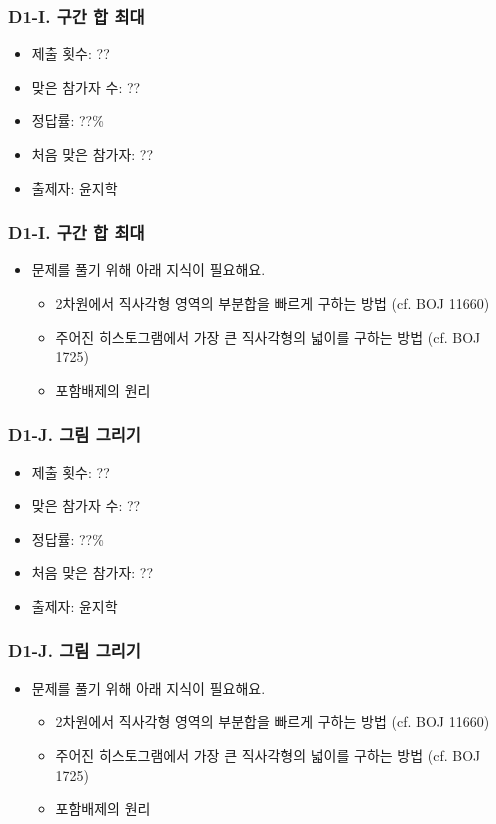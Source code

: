 \documentclass[xetex]{beamer}
\begin{document}
\begin{frame}
  \frametitle{D1-I. 구간 합 최대}
  \begin{itemize}
    \item 제출 횟수: ??
    \item 맞은 참가자 수: ??
    \item 정답률: ??\%
    \item 처음 맞은 참가자: ??
    \item 출제자: 윤지학
  \end{itemize}
\end{frame}

\begin{frame}
  \frametitle{D1-I. 구간 합 최대}
  \begin{itemize}
    \item 문제를 풀기 위해 아래 지식이 필요해요.
    \begin{itemize}
      \item 2차원에서 직사각형 영역의 부분합을 빠르게 구하는 방법 (cf. BOJ 11660)
      \item 주어진 히스토그램에서 가장 큰 직사각형의 넓이를 구하는 방법 (cf. BOJ 1725)
      \item 포함배제의 원리
    \end{itemize}
  \end{itemize}
\end{frame}

\begin{frame}
  \frametitle{D1-J. 그림 그리기}
  \begin{itemize}
    \item 제출 횟수: ??
    \item 맞은 참가자 수: ??
    \item 정답률: ??\%
    \item 처음 맞은 참가자: ??
    \item 출제자: 윤지학
  \end{itemize}
\end{frame}

\begin{frame}
  \frametitle{D1-J. 그림 그리기}
  \begin{itemize}
    \item 문제를 풀기 위해 아래 지식이 필요해요.
    \begin{itemize}
      \item 2차원에서 직사각형 영역의 부분합을 빠르게 구하는 방법 (cf. BOJ 11660)
      \item 주어진 히스토그램에서 가장 큰 직사각형의 넓이를 구하는 방법 (cf. BOJ 1725)
      \item 포함배제의 원리
    \end{itemize}
  \end{itemize}
\end{frame}
\end{document}

